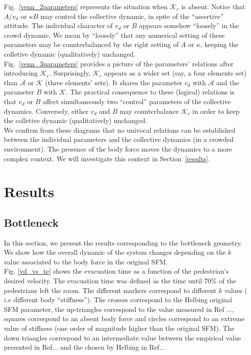 \documentclass[preprint,12pt]{elsarticle}
\begin{document}
Fig.~\ref{venn_2parameters} represents the situation when $\mathcal{K}_c$ is 
absent. Notice that $A/v_d$ or $\kappa B$ may control the collective 
dynamic, in spite of the ``assertive'' attitude. The individual character of 
$v_d$ or $B$ appears somehow ``loosely'' in the crowd dynamic. We mean by 
``loosely'' that any numerical setting of these parameters may be 
counterbalanced by the right setting of $A$ or $\kappa$, keeping the 
colletive dynamic (qualitatively) unchanged.  \\

Fig.~\ref{venn_3parameters} provides a picture of the parameters' relations 
after introducing $\mathcal{K}_c$. Surprisingly, $\mathcal{K}_c$ appears as a
wider set (say, a four elements set) than $\mathcal{A}$ or $\mathcal{K}$ (three 
elements' sets). It shares the parameter $v_d$ with $\mathcal{A}$ and the 
parameter $B$ with $\mathcal{K}$. The practical consequence to these (logical)
relations is that $v_d$ or $B$ affect simultaneously two ``control'' parameters 
of the collective dynamics. Conversely, either $v_d$ and $B$ may counterbalance 
$\mathcal{K}_c$ in order to keep the colletive dynamic (qualitatively) 
unchanged.  \\

We confirm from these diagrams that no univocal relations can be established 
between the individual parameters and the collective dynamics (in a crowded 
environment). The presence of the body force moves the dynamics to a more 
complex context. We will investigate this context in Section~\ref{results}. \\


\section{\label{results}Results}


\subsection{\label{bottleneck} Bottleneck}


In this section, we present the results corresponding to the bottleneck geometry. We show how the overall dynamic of the system changes depending on the $k$ value associated to the body force in the original SFM.\\

Fig. \ref{vd_vs_te} shows the evacuation time as a function of the pedestrian's desired velocity. The evacuation time was defined as the time until 70\% of the pedestrians left the room. The different markers correspond to different $k$ values ($i.e$ different body ``stiffness''). The crosses correspond to the Helbing original SFM parameter, the up-triangles correspond to the value measured in Ref ..., squares correspond to an absent body force and circles correspond to an extreme value of stiffness (one order of magnitude higher than the original SFM). The down triangles correspond to an intermediate value between the empirical value presented in Ref... and the chosen by Helbing in Ref...\\
\end{document}
